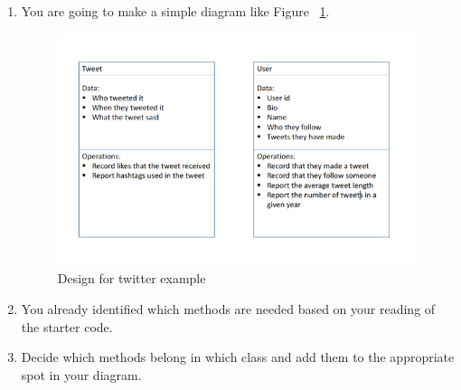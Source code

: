 \documentclass[12pt]{article}
\begin{document}
\begin{enumerate}[1.]
    \item You are going to make a simple diagram like Figure ~\ref{fig:uml}.

    \begin{figure}[H]
        \begin{center}
        \includegraphics[width=0.8\linewidth]{../../images/lab_3/uml.png}
        \end{center}
        \caption{Design for twitter example}
        \label{fig:uml}
    \end{figure}

    \item You already identified which methods are needed based on your reading of the
    starter code.
    \item Decide which methods belong in which class and add them to the appropriate
    spot in your diagram.


\end{enumerate}
\end{document}
